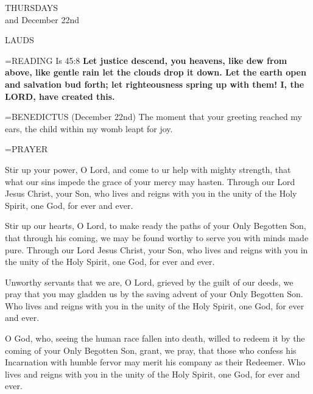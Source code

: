 \begin{center}\normalsize THURSDAYS\\
\footnotesize and December 22nd\\
\end{center}

\begin{flushleft}\normalsize LAUDS\\\end{flushleft}

\hangindent=\parindent \small{\uppercase{READING}} Is 45:8 \textbf{Let justice descend, you heavens, like dew from above, like gentle rain let the clouds drop it down. Let the earth open and salvation bud forth; let righteousness spring up with them! I, the LORD, have created this.\\}

\hangindent=\parindent \small{BENEDICTUS  (December 22nd) The moment that your greeting reached my ears, the child within my womb leapt for joy. \\}


\hangindent=\parindent \small PRAYER
\begin{description}[labelindent=\parindent, leftmargin=*]
\item [Week 1:]  Stir up your power, O Lord, and come to ur help with mighty strength, that what our sins impede the grace of your mercy may hasten. Through our Lord Jesus Christ, your Son, who lives and reigns with you in the unity of the Holy Spirit, one God, for ever and ever.
\item [Week 2:]  Stir up our hearts, O Lord, to make ready the paths of your Only Begotten Son, that through his coming, we may be found worthy to serve you with minds made pure. Through our Lord Jesus Christ, your Son, who lives and reigns with you in the unity of the Holy Spirit, one God, for ever and ever.
\item [Week 3:]  Unworthy servants that we are, O Lord, grieved by the guilt of our deeds, we pray that you may gladden us by the saving advent of your Only Begotten Son. Who lives and reigns with you in the unity of the Holy Spirit, one God, for ever and ever.
\item [December 22nd:]  O God, who, seeing the human race fallen into death, willed to redeem it by the coming of your Only Begotten Son, grant, we pray, that those who confess his Incarnation with humble fervor may merit his company as their Redeemer. Who lives and reigns with you in the unity of the Holy Spirit, one God, for ever and ever.
\end{description}

